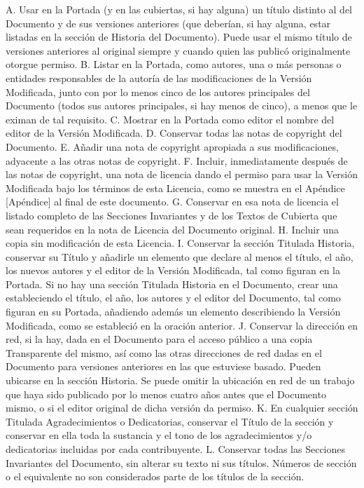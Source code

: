 \documentclass[a4paper, 11pt, oneside]{report}
\begin{document}
A. Usar en la Portada (y en las cubiertas, si hay alguna) un título distinto al del Documento y de sus versiones anteriores (que deberían, si hay alguna, estar listadas en la sección de Historia del Documento). Puede usar el mismo título de versiones anteriores al original siempre y cuando quien las publicó originalmente otorgue permiso.
B. Listar en la Portada, como autores, una o más personas o entidades responsables de la autoría de las modificaciones de la Versión Modificada, junto con por lo menos cinco de los autores principales del Documento (todos sus autores principales, si hay menos de cinco), a menos que le eximan de tal requisito.
C. Mostrar en la Portada como editor el nombre del editor de la Versión Modificada.
D. Conservar todas las notas de copyright del Documento.
E. Añadir una nota de copyright apropiada a sus modificaciones, adyacente a las otras notas de copyright.
F. Incluir, inmediatamente después de las notas de copyright, una nota de licencia dando el permiso para usar la Versión Modificada bajo los términos de esta Licencia, como se muestra en el Apéndice [Apéndice] al final de este documento.
G. Conservar en esa nota de licencia el listado completo de las Secciones Invariantes y de los Textos de Cubierta que sean requeridos en la nota de Licencia del Documento original.
H. Incluir una copia sin modificación de esta Licencia.
I. Conservar la sección Titulada Historia, conservar su Título y añadirle un elemento que declare al menos el título, el año, los nuevos autores y el editor de la Versión Modificada, tal como figuran en la Portada. Si no hay una sección Titulada Historia en el Documento, crear una estableciendo el título, el año, los autores y el editor del Documento, tal como figuran en su Portada, añadiendo además un elemento describiendo la Versión Modificada, como se estableció en la oración anterior.
J. Conservar la dirección en red, si la hay, dada en el Documento para el acceso público a una copia Transparente del mismo, así como las otras direcciones de red dadas en el Documento para versiones anteriores en las que estuviese basado. Pueden ubicarse en la sección Historia. Se puede omitir la ubicación en red de un trabajo que haya sido publicado por lo menos cuatro años antes que el Documento mismo, o si el editor original de dicha versión da permiso.
K. En cualquier sección Titulada Agradecimientos o Dedicatorias, conservar el Título de la sección y conservar en ella toda la sustancia y el tono de los agradecimientos y/o dedicatorias incluidas por cada contribuyente.
L. Conservar todas las Secciones Invariantes del Documento, sin alterar su texto ni sus títulos. Números de sección o el equivalente no son considerados parte de los títulos de la sección.
\end{document}
